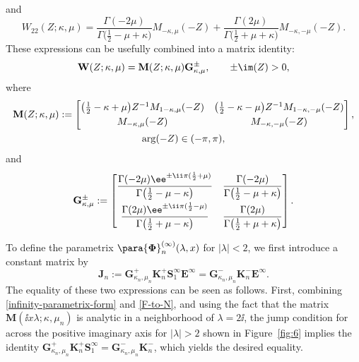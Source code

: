 and
\begin{equation*}
 W_{22}(Z;\kappa,\mu)=\frac{\Gamma(-2\mu)}{\Gamma\big(\frac{1}{2}-\mu+\kappa\big)}M_{-\kappa,\mu}(-Z) +\frac{\Gamma(2\mu)}{\Gamma\big(\frac{1}{2}+\mu+\kappa\big)}M_{-\kappa,-\mu}(-Z).
\end{equation*}
These expressions can be usefully combined into a matrix identity:
\begin{equation}
 \mathbf{W}(Z;\kappa,\mu)=\mathbf{M}(Z;\kappa,\mu)\mathbf{G}^\pm_{\kappa,\mu},\qquad \pm\im(Z)>0,
 \label{F-to-N}
\end{equation}
where
\begin{gather}
 \mathbf{M}(Z;\kappa,\mu):=
 \begin{bmatrix}
 \big(\frac{1}{2}-\kappa+\mu\big)Z^{-1}M_{1-\kappa,\mu}(-Z) & \big(\frac{1}{2}-\kappa-\mu\big)Z^{-1}M_{1-\kappa,-\mu}(-Z)\vspace{1mm}\\
 M_{-\kappa,\mu}(-Z) & M_{-\kappa,-\mu}(-Z)
 \end{bmatrix},\nonumber\\
 \arg(-Z)\in (-\pi,\pi),
 \label{N-define}
\end{gather}
and
\begin{equation*} %
 \mathbf{G}^\pm_{\kappa,\mu}:=\begin{bmatrix}
 \displaystyle \frac{\Gamma(-2\mu)\ee^{\pm \ii\pi(\frac{1}{2}+\mu)}}{\Gamma\big(\frac{1}{2}-\mu-\kappa\big)} &
 \displaystyle \frac{\Gamma(-2\mu)}{\Gamma\big(\frac{1}{2}-\mu+\kappa\big)}\vspace{1mm}\\
 \displaystyle\frac{\Gamma(2\mu)\ee^{\pm \ii\pi(\frac{1}{2}-\mu)}}{\Gamma\big(\frac{1}{2}+\mu-\kappa\big)} &
 \displaystyle \frac{\Gamma(2\mu)}{\Gamma\big(\frac{1}{2}+\mu+\kappa\big)}
 \end{bmatrix}.
\end{equation*}

To define the parametrix $\para{\boldsymbol{\Phi}}_n^{(\infty)}(\lambda,x)$ for $|\lambda|<2$, we first introduce a constant matrix by
\begin{equation}
 \mathbf{J}_n:=\mathbf{G}_{\kappa_n,\mu_n}^+ \mathbf{K}_n^+ \mathbf{S}_1^{\infty} \mathbf{E}^{\infty}=\mathbf{G}_{\kappa_n,\mu_n}^- \mathbf{K}_n^- \mathbf{E}^{\infty}.
\label{eq:M-infty}
\end{equation}
The equality of these two expressions can be seen as follows. First, combining \eqref{infinity-parametrix-form} and \eqref{F-to-N}, and using the fact that the matrix $\mathbf{M}(\ii x\lambda;\kappa,\mu_n)$ is analytic in a neighborhood of $\lambda=2\ii$, the jump condition for  across the positive imaginary axis for $|\lambda|>2$ shown in Figure~\ref{fig:6} implies the identity $\mathbf{G}_{\kappa_n,\mu_n}^+\mathbf{K}_n^+ \mathbf{S}_1^{\infty}=\mathbf{G}_{\kappa_n,\mu_n}^-\mathbf{K}_n^-$, which yields the desired equality.

